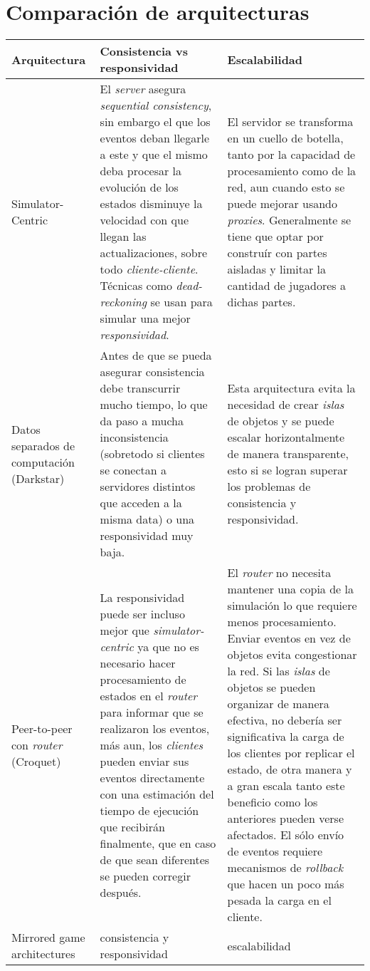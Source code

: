 \section{Comparación de arquitecturas}

%

\small
\begin{longtable}{|p{3cm}|p{6cm}|p{6cm}|}
\hline
\textbf{Arquitectura} & \textbf{Consistencia vs responsividad} & \textbf{Escalabilidad} \\ \hline
Simulator-Centric &
El \emph{server} asegura \emph{sequential consistency}, sin embargo el que los eventos deban llegarle a este y que el mismo deba procesar la evolución de los estados disminuye la velocidad con que llegan las actualizaciones, sobre todo \emph{cliente-cliente}. Técnicas como \emph{dead-reckoning} se usan para simular una mejor \emph{responsividad}. &
El servidor se transforma en un cuello de botella, tanto por la capacidad de procesamiento como de la red, aun cuando esto se puede mejorar usando \emph{proxies}. Generalmente se tiene que optar por construír con partes aisladas y limitar la cantidad de jugadores a dichas partes. \\
\hline
Datos separados de computación (Darkstar) &
Antes de que se pueda asegurar consistencia debe transcurrir mucho tiempo, lo que da paso a mucha inconsistencia (sobretodo si clientes se conectan a servidores distintos que acceden a la misma data) o una responsividad muy baja. &
Esta arquitectura evita la necesidad de crear \emph{islas} de objetos y se puede escalar horizontalmente de manera transparente, esto si se logran superar los problemas de consistencia y responsividad. \\
\hline
Peer-to-peer con \emph{router} (Croquet) &
La responsividad puede ser incluso mejor que \emph{simulator-centric} ya que no es necesario hacer procesamiento de estados en el \emph{router} para informar que se realizaron los eventos, más aun, los \emph{clientes} pueden enviar sus eventos directamente con una estimación del tiempo de ejecución que recibirán finalmente, que en caso de que sean diferentes se pueden corregir después. &
El \emph{router} no necesita mantener una copia de la simulación lo que requiere menos procesamiento. \newline
Enviar eventos en vez de objetos evita congestionar la red. \newline
Si las \emph{islas} de objetos se pueden organizar de manera efectiva, no debería ser significativa la carga de los clientes por replicar el estado, de otra manera y a gran escala tanto este beneficio como los anteriores pueden verse afectados. \newline El sólo envío de eventos requiere mecanismos de \emph{rollback} que hacen un poco más pesada la carga en el cliente. \\
\hline
Mirrored game architectures &
consistencia y responsividad &
escalabilidad \\
\hline
\end{longtable}
\normalsize


